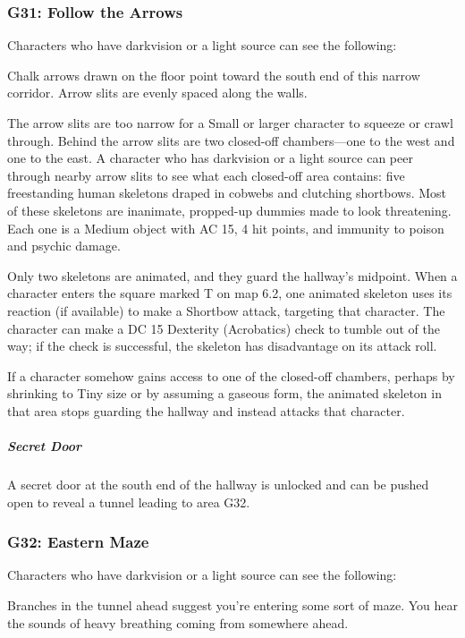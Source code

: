 \documentclass[10pt,a4paper,twoside,bg=print,twocolumn,openany,nodeprecatedcode]{dndbook}
\begin{document}
\subsubsection{G31: Follow the Arrows}
Characters who have darkvision or a light source can see the following:

\begin{DndReadAloud}{}
Chalk arrows drawn on the floor point toward the south end of this narrow corridor. Arrow slits are evenly spaced along the walls.

\end{DndReadAloud}

The arrow slits are too narrow for a Small or larger character to squeeze or crawl through. Behind the arrow slits are two closed-off chambers—one to the west and one to the east. A character who has darkvision or a light source can peer through nearby arrow slits to see what each closed-off area contains: five freestanding human skeletons draped in cobwebs and clutching shortbows. Most of these skeletons are inanimate, propped-up dummies made to look threatening. Each one is a Medium object with AC 15, 4 hit points, and immunity to poison and psychic damage.

Only two skeletons are animated, and they guard the hallway's midpoint. When a character enters the square marked T on map 6.2, one animated skeleton uses its reaction (if available) to make a Shortbow attack, targeting that character. The character can make a DC 15 Dexterity (Acrobatics) check to tumble out of the way; if the check is successful, the skeleton has disadvantage on its attack roll.

If a character somehow gains access to one of the closed-off chambers, perhaps by shrinking to Tiny size or by assuming a gaseous form, the animated skeleton in that area stops guarding the hallway and instead attacks that character.

\subparagraph{Secret Door}
A secret door at the south end of the hallway is unlocked and can be pushed open to reveal a tunnel leading to area G32.

\subsubsection{G32: Eastern Maze}
Characters who have darkvision or a light source can see the following:

\begin{DndReadAloud}{}
Branches in the tunnel ahead suggest you're entering some sort of maze. You hear the sounds of heavy breathing coming from somewhere ahead.

\end{DndReadAloud}
\end{document}

